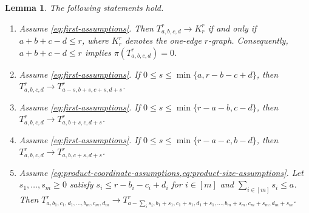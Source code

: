 \documentclass[10pt,a4paper]{article}
\theoremstyle{plain}
\newtheorem{lemma}[lemma]{Lemma}
\theoremstyle{definition}
\theoremstyle{plain}
\begin{document}
\begin{lemma}\label{lem:first-hom-reductions}
The following statements hold.
\begin{enumerate}[label=\textup{(\roman*)},ref=\textup{(\roman*)}]
\item\label{itm:first-hom-reduction-one-edge} Assume \cref{eq:first-assumptions}.  Then $T^r_{a,b,c,d}\to K^r_r$ if and only if $a+b+c-d\le r$,  where $K^r_r$ denotes the \emph{one-edge $r$-graph}.  Consequently, $a+b+c-d\le r$ implies $\pi(T^r_{a,b,c,d})=0$.
\item\label{itm:first-hom-reduction-common-part} Assume \cref{eq:first-assumptions}. If $0\le s\le\min\{a,r-b-c+d\}$, then $T^r_{a,b,c,d}\longrightarrow T^r_{a-s,b+s,c+s,d+s}$. 
\item\label{itm:first-hom-reduction-first-side} Assume \cref{eq:first-assumptions}. If $0\le s\le\min\{r-a-b,c-d\}$, then $T^r_{a,b,c,d}\longrightarrow T^r_{a,b+s,c,d+s}$. 
\item\label{itm:first-hom-reduction-second-side} Assume \cref{eq:first-assumptions}. If $0\le s\le\min\{r-a-c,b-d\}$, then $T^r_{a,b,c,d}\longrightarrow T^r_{a,b,c+s,d+s}$. 
\item\label{itm:product-hom-reduction} Assume \cref{eq:product-coordinate-assumptions,eq:product-size-assumptions}.  Let $s_1,\ldots,s_m\ge0$ satisfy $s_i\le r-b_i-c_i+d_i$ for $i \in [m]$ and $\sum_{i\in [m]} s_i\le a$. Then $T^r_{a,b_1,c_1,d_1,\ldots,b_m,c_m,d_m} \to T^r_{a-\sum_i s_i, b_1+s_1,c_1+s_1,d_1+s_1, \ldots, b_m+s_m,c_m+s_m,d_m+s_m}$. 
\end{enumerate}
\end{lemma}
\end{document}
